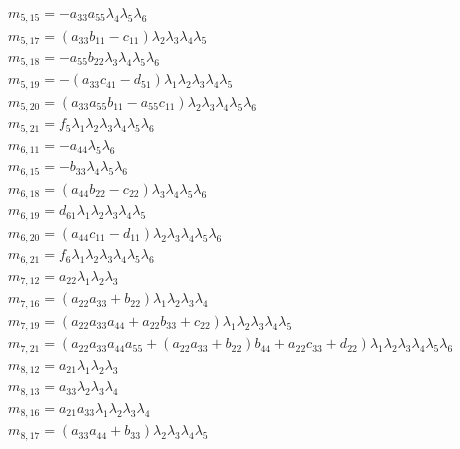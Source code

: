 \documentclass{article}
\begin{document}
\begin{align*}
&m_{5,15}=-a_{33} a_{55} \lambda_{4} \lambda_{5} \lambda_{6}\\
&m_{5,17}={\left(a_{33} b_{11} - c_{11}\right)} \lambda_{2} \lambda_{3} \lambda_{4} \lambda_{5}\\
&m_{5,18}=-a_{55} b_{22} \lambda_{3} \lambda_{4} \lambda_{5} \lambda_{6}\\
&m_{5,19}=-{\left(a_{33} c_{41} - d_{51}\right)} \lambda_{1} \lambda_{2} \lambda_{3} \lambda_{4} \lambda_{5}\\
&m_{5,20}={\left(a_{33} a_{55} b_{11} - a_{55} c_{11}\right)} \lambda_{2} \lambda_{3} \lambda_{4} \lambda_{5} \lambda_{6}\\
&m_{5,21}=f_{5} \lambda_{1} \lambda_{2} \lambda_{3} \lambda_{4} \lambda_{5} \lambda_{6}\\
&m_{6,11}=-a_{44} \lambda_{5} \lambda_{6}\\
&m_{6,15}=-b_{33} \lambda_{4} \lambda_{5} \lambda_{6}\\
&m_{6,18}={\left(a_{44} b_{22} - c_{22}\right)} \lambda_{3} \lambda_{4} \lambda_{5} \lambda_{6}\\
&m_{6,19}=d_{61} \lambda_{1} \lambda_{2} \lambda_{3} \lambda_{4} \lambda_{5}\\
&m_{6,20}={\left(a_{44} c_{11} - d_{11}\right)} \lambda_{2} \lambda_{3} \lambda_{4} \lambda_{5} \lambda_{6}\\
&m_{6,21}=f_{6} \lambda_{1} \lambda_{2} \lambda_{3} \lambda_{4} \lambda_{5} \lambda_{6}\\
&m_{7,12}=a_{22} \lambda_{1} \lambda_{2} \lambda_{3}\\
&m_{7,16}={\left(a_{22} a_{33} + b_{22}\right)} \lambda_{1} \lambda_{2} \lambda_{3} \lambda_{4}\\
&m_{7,19}={\left(a_{22} a_{33} a_{44} + a_{22} b_{33} + c_{22}\right)} \lambda_{1} \lambda_{2} \lambda_{3} \lambda_{4} \lambda_{5}\\
&m_{7,21}={\left(a_{22} a_{33} a_{44} a_{55} + {\left(a_{22} a_{33} + b_{22}\right)} b_{44} + a_{22} c_{33} + d_{22}\right)} \lambda_{1} \lambda_{2} \lambda_{3} \lambda_{4} \lambda_{5} \lambda_{6}\\
&m_{8,12}=a_{21} \lambda_{1} \lambda_{2} \lambda_{3}\\
&m_{8,13}=a_{33} \lambda_{2} \lambda_{3} \lambda_{4}\\
&m_{8,16}=a_{21} a_{33} \lambda_{1} \lambda_{2} \lambda_{3} \lambda_{4}\\
&m_{8,17}={\left(a_{33} a_{44} + b_{33}\right)} \lambda_{2} \lambda_{3} \lambda_{4} \lambda_{5}\\
\end{align*}
\end{document}
